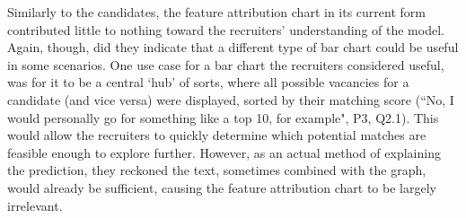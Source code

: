 Similarly to the candidates, the feature attribution chart in its current form contributed little to nothing toward the recruiters' understanding of the model. Again, though, did they indicate that a different type of bar chart could be useful in some scenarios. One use case for a bar chart the recruiters considered useful, was for it to be a central `hub' of sorts, where all possible vacancies for a candidate (and vice versa) were displayed, sorted by their matching score (``No, I would personally go for something like a top 10, for example", P3, Q2.1). This would allow the recruiters to quickly determine which potential matches are feasible enough to explore further. However, as an actual method of explaining the prediction, they reckoned the text, sometimes combined with the graph, would already be sufficient, causing the feature attribution chart to be largely irrelevant. 

